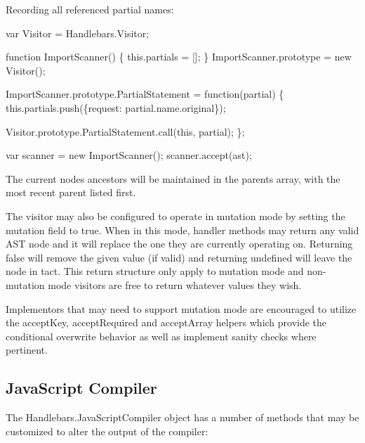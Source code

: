 Recording all referenced partial names\+:


\begin{DoxyCode}
var Visitor = Handlebars.Visitor;

function ImportScanner() \{
  this.partials = [];
\}
ImportScanner.prototype = new Visitor();

ImportScanner.prototype.PartialStatement = function(partial) \{
  this.partials.push(\{request: partial.name.original\});

  Visitor.prototype.PartialStatement.call(this, partial);
\};

var scanner = new ImportScanner();
scanner.accept(ast);
\end{DoxyCode}


The current node\textquotesingle{}s ancestors will be maintained in the {\ttfamily parents} array, with the most recent parent listed first.

The visitor may also be configured to operate in mutation mode by setting the {\ttfamily mutation} field to true. When in this mode, handler methods may return any valid A\+ST node and it will replace the one they are currently operating on. Returning {\ttfamily false} will remove the given value (if valid) and returning {\ttfamily undefined} will leave the node in tact. This return structure only apply to mutation mode and non-\/mutation mode visitors are free to return whatever values they wish.

Implementors that may need to support mutation mode are encouraged to utilize the {\ttfamily accept\+Key}, {\ttfamily accept\+Required} and {\ttfamily accept\+Array} helpers which provide the conditional overwrite behavior as well as implement sanity checks where pertinent.

\subsection*{Java\+Script Compiler}

The {\ttfamily Handlebars.\+Java\+Script\+Compiler} object has a number of methods that may be customized to alter the output of the compiler\+:



